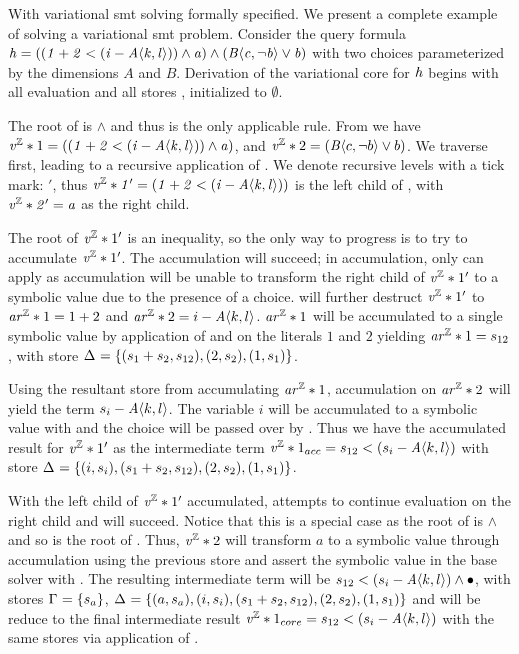 \label{section:vsmt:example}
%
With variational \ac{smt} solving formally specified. We present a complete
example of solving a variational \ac{smt} problem. Consider the query formula
\newline$\kf{\hV = ((1 + 2 < (i - \chc[A]{k,l})) \wedge a) \wedge
  (\chc[B]{c,\neg b} \vee b)}$ with two choices parameterized by the dimensions
$A$ and $B$. Derivation of the variational core for $\mathit{h}$ begins with all
evaluation and all stores \aStore{}, \eStore{} initialized to $\emptyset$.

The root of \hV{} is $\wedge$ and thus \evAnd{} is the only applicable rule.
From \evAnd{} we have $\eIL*{1} = \kf{((1 + 2 < (i - \chc[A]{k,l})) \wedge a)}$,
and $\eIL*{2} = (\chc[B]{c,\neg b} \vee b)$. We traverse  first, leading
to a recursive application of \evAnd{}. We denote recursive levels with a tick
mark: $'$, thus $\kf{\eIL*{1}' = (1 + 2 < (i - \chc[A]{k,l}))}$ is the left
child of , with $\mathit{\mathit{v^{\mathbb{Z}}}*{2}' = a}$ as the right child.

The root of $\mathit{v^{\mathbb{Z}}}*{1}'$ is an inequality, so the only way to progress is to try
to accumulate $\mathit{v^{\mathbb{Z}}}*{1}'$. The accumulation will succeed; in accumulation, only
\acInEqV{} can apply as accumulation will be unable to transform the right child
of $\mathit{v^{\mathbb{Z}}}*{1}'$ to a symbolic value due to the presence of a choice. \acInEqV{}
will further destruct $\mathit{v^{\mathbb{Z}}}*{1}'$ to $\mathit{ar^{\mathbb{Z}}}*{1} = 1 + 2$ and $\eAR*{2} = i -
\chc[A]{k,l}$. $\mathit{ar^{\mathbb{Z}}}*{1}$ will be accumulated to a single symbolic value by
application of \acArithS{} and \acRef{} on the literals $1$ and $2$ yielding
$\mathit{ar^{\mathbb{Z}}}*{1} = s_{12}$, with store $\aStore{}=\set{(s_{1} + s_{2}, s_{12}),
  (2,s_{2}), (1,s_{1})}$.

Using the resultant store from accumulating $\mathit{ar^{\mathbb{Z}}}*{1}$, accumulation on
$\mathit{ar^{\mathbb{Z}}}*{2}$ will yield the term $s_{i} - \chc[A]{k,l}$. The variable $i$ will be
accumulated to a symbolic value with \acRef{} and the choice will be passed over
by \acChc{}. Thus we have the accumulated result for $\mathit{v^{\mathbb{Z}}}*{1}'$ as the
intermediate term $\eIL*{1}_{acc} = s_{12} < (s_{i} - \chc[A]{k,l})$ with store
$\aStore{}=\set{(i, s_{i}),(s_{1} + s_{2}, s_{12}), (2,s_{2}), (1,s_{1})}$.

With the left child of $\mathit{v^{\mathbb{Z}}}*{1}'$ accumulated, \evAnd{} attempts to continue
evaluation on the right child and will succeed. Notice that this is a special
case as the root of  is $\wedge$ and so is the root of \hV{}. Thus,
$\mathit{v^{\mathbb{Z}}}*{2}$ will transform $a$ to a symbolic value through accumulation using the
previous store and assert the symbolic value in the base solver with \evSym{}.
The resulting intermediate term will be $s_{12} < (s_{i} - \chc[A]{k,l}) \wedge
\unit{}$, with stores $\eStore{}=\set{s_{a}}$, $\aStore{}=\set{(a,s_{a}),(i,
  s_{i}),(s_{1} + s_{2}, s_{12}), (2,s_{2}), (1,s_{1})}$ and will be reduce to
the final intermediate result $\eIL*{1}_{core} = s_{12} < (s_{i} -
\chc[A]{k,l})$ with the same stores via application of \evAndR{}.

